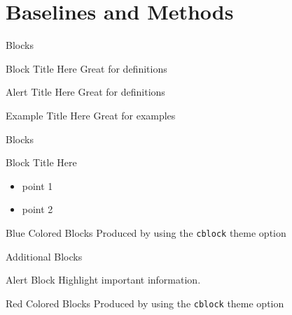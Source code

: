 \documentclass[newPxFont,numfooter,sectionpages]{beamer}
\begin{document}
    \section{Baselines and Methods}\label{Blocks}
    
    
    
    \begin{frame}{Blocks}
    
    \begin{block}{Block Title Here}
            Great for definitions
    \end{block}
    
    \begin{alertblock}{Alert Title Here}
            Great for definitions
    \end{alertblock}
    
    \begin{exampleblock}{Example Title Here}
            Great for examples
    \end{exampleblock}
    \end{frame}
    
    
    \begin{frame}{Blocks}
    
    \begin{block}{Block Title Here}
        \begin{itemize}
            \item point 1
            \item point 2
        \end{itemize}
    \end{block}
    
    \begingroup
    \begin{block}{Blue Colored Blocks}
        Produced by using the \texttt{cblock} theme option
    \end{block}
    \endgroup
    \end{frame}
    
    
    \begin{frame}{Additional Blocks}
    \begin{alertblock}{Alert Block}
        Highlight important information.
    \end{alertblock}
    
    \begingroup
    \begin{block}{Red Colored Blocks}
        Produced by using the \texttt{cblock} theme option
    \end{block}
    \endgroup
    \end{frame}
    
\end{document}
